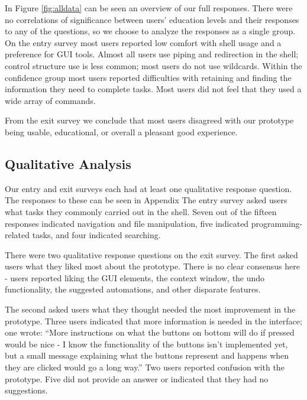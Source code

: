 In Figure \ref{fig:alldata} can be seen an overview of our full responses. There
were no correlations of significance between users' education levels and their
responses to any of the questions, so we choose to analyze the responses as a
single group. On the entry survey most users reported low comfort with shell
usage and a preference for GUI tools. Almost all users use piping and
redirection in the shell; control structure use is less common; most users do
not use wildcards. Within the confidence group most users reported difficulties
with retaining and finding the information they need to complete tasks. Most
users did not feel that they used a wide array of commands.

From the exit survey we conclude that most users disagreed with our prototype
being usable, educational, or overall a pleasant good experience.

\subsection{Qualitative Analysis}

Our entry and exit surveys each had at least one qualitative response question.
The responses to these can be seen in Appendix
The entry survey asked users what tasks they commonly carried out in the shell.
Seven out of the fifteen responses indicated navigation and file manipulation,
five indicated programming-related tasks, and four indicated searching.

There were two qualitative response questions on the exit survey. The first
asked users what they liked most about the prototype. There is no clear
consensus here \-- users reported liking the GUI elements, the context window, the
undo functionality, the suggested automations, and other disparate features.

The second asked users what they thought needed the most improvement in the
prototype. Three users indicated that more information is needed in the
interface; one wrote: ``More instructions on what the buttons on bottom will do
if pressed would be nice \-- I know the functionality of the buttons isn't
implemented yet, but a small message explaining what the buttons represent and
happens when they are clicked would go a long way.'' Two users reported
confusion with the prototype. Five did not provide an answer or indicated that
they had no suggestions.

